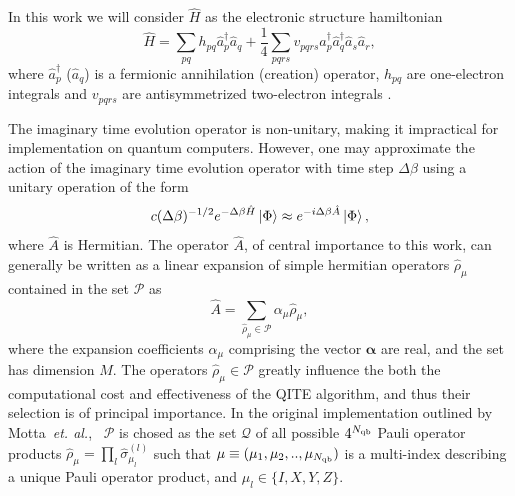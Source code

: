 \documentclass[aip,jcp,amsmath,amssymb, reprint]{revtex4-1}
\newcommand{\cop}[1]{\hat{a}^{\dagger}_{#1}}
\newcommand{\aop}[1]{\hat{a}_{#1}}
\providecommand{\norm}[1]{\lVert#1\rVert}
\begin{document}
In this work we will consider $\hat{H}$ as the electronic structure hamiltonian
\begin{equation}
\hat{H} = \sum_{pq} h_{pq} \cop{p} \aop{q}
+ \frac{1}{4} \sum_{pqrs}
v_{pqrs} \cop{p} \cop{q} \aop{s} \aop{r},
\end{equation}
where $\cop{p}$ ($\aop{q}$) is a fermionic annihilation (creation) operator, $h_{pq}$ are one-electron integrals and $v_{pqrs}$
are antisymmetrized two-electron integrals \cite{crawford2000introduction}.

The imaginary time evolution operator is non-unitary, making it impractical for implementation on quantum computers.
However, one may approximate the action of the imaginary time evolution operator with time step $\Delta \beta$ using a unitary operation of the form  
\begin{equation}
 c(\Delta \beta)^{-1/2} e^{-\Delta \beta \hat{H} } \ket{\Phi} \approx e^{-i \Delta \beta \hat{A} } \ket{\Phi},
\end{equation}
where $\hat{A}$ is Hermitian. 
The operator $\hat{A}$, of central importance to this work, can generally be written as a linear expansion of simple hermitian operators $\hat{\rho}_\mu$ contained in the set $\mathcal{P}$ as
\begin{equation}
\hat{A} = \sum_{\hat{\rho}_\mu \in \mathcal{P}} \alpha_\mu \hat{\rho}_\mu,
\end{equation} 
where the expansion coefficients $\alpha_\mu$ comprising the vector $\boldsymbol{\alpha}$ are real, and the set has dimension $M$.
The operators $\hat{\rho}_\mu \in \mathcal{P}$ greatly influence the both the computational cost and effectiveness of the QITE algorithm, and thus their selection is of principal importance.  
In the original implementation outlined by Motta~\textit{et. al.},~\cite{motta2019determining} $\mathcal{P}$ is chosed as the set $\mathcal{Q}$ of all possible $4^{N_{\rm{qb}}}$ Pauli operator products $\hat{ \rho}_\mu  = \prod_l \hat{\sigma}_{\mu_l}^{(l)}$ such that $\mu \equiv (\mu_1, \mu_2, .., \mu_{N_{\rm{qb}}}) $ is a multi-index describing a unique Pauli operator product, and $\mu_l \in \{ I, X, Y, Z \}$.
\end{document}
